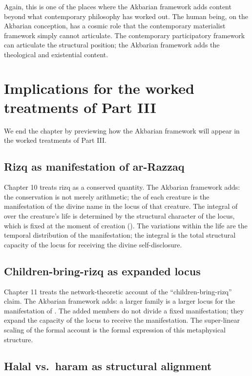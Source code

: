 Again, this is one of the places where the Akbarian framework adds
content beyond what contemporary philosophy has worked out. The
human being, on the Akbarian conception, has a cosmic role that the
contemporary materialist framework simply cannot articulate. The
contemporary participatory framework can articulate the structural
position; the Akbarian framework adds the theological and
existential content.

\section{Implications for the worked treatments of Part III}
\label{sec:akbarian-implications}

We end the chapter by previewing how the Akbarian framework will
appear in the worked treatments of Part III.

\subsection{Rizq as manifestation of ar-Razzaq}

Chapter 10 treats rizq as a conserved quantity. The Akbarian
framework adds: the conservation is not merely arithmetic; the
 of each creature is the manifestation of the divine name
 in the locus of that creature. The integral of
 over the creature's life is determined by the structural
character of the locus, which is fixed at the moment of creation
(). The variations within the life are
the temporal distribution of the manifestation; the integral is the
total structural capacity of the locus for receiving the divine
self-disclosure.

\subsection{Children-bring-rizq as expanded locus}

Chapter 11 treats the network-theoretic account of the
``children-bring-rizq'' claim. The Akbarian framework adds: a
larger family is a larger locus for the manifestation of
. The added members do not divide a fixed
manifestation; they expand the capacity of the locus to receive
the manifestation. The super-linear scaling of the formal account
is the formal expression of this metaphysical structure.

\subsection{Halal vs.\ haram as structural alignment}

